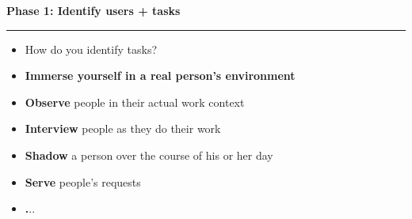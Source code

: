\documentclass[pdf]{beamer}
\begin{document}
\begin{frame}
\vspace{8mm}
\textcolor{myBlue}{\textbf{\Large{Phase 1: Identify users + tasks}}}

\textcolor{red}{\rule{10cm}{1mm}}	

\begin{itemize}
	\item[]  {\LARGE How do you identify tasks?} \newline
	\item [] {\textbf{Immerse yourself in a real person’s environment}}		
    \item [] \textbf{Observe} people in their actual work context
    \item [] \textbf{Interview} people as they do their work
    \item [] \textbf{Shadow} a person over the course of his or her day
    \item [] \textbf {Serve} people's requests
    \item [] \textbf ...
\end{itemize}
\end{frame}
\end{document}
